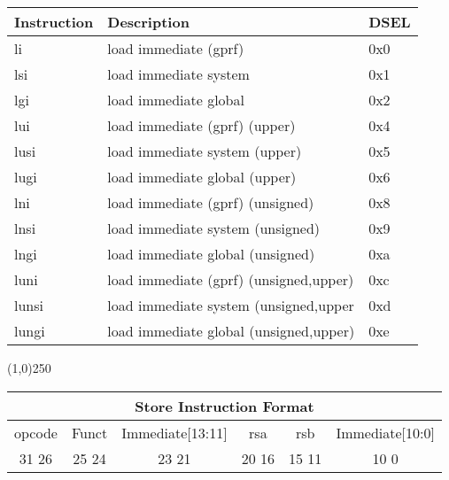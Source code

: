 \documentclass[letterpaper, 11pt]{article}
\begin{document}
	\begin{center}
		\begin{tabular}{|l|l|l|} \hline
			Instruction & Description 								& DSEL\\ \hline
			li			& load immediate (gprf)						& 0x0 \\ \hline
			lsi			& load immediate system						& 0x1 \\ \hline
			lgi			& load immediate global						& 0x2 \\ \hline
			lui			& load immediate (gprf)	(upper)				& 0x4 \\ \hline
			lusi		& load immediate system	(upper)				& 0x5 \\ \hline
			lugi		& load immediate global	(upper)				& 0x6 \\ \hline
			lni			& load immediate (gprf)	(unsigned)			& 0x8 \\ \hline
			lnsi		& load immediate system	(unsigned)			& 0x9 \\ \hline
			lngi		& load immediate global	(unsigned)			& 0xa \\ \hline 
			luni		& load immediate (gprf) (unsigned,upper)	& 0xc \\ \hline
			lunsi		& load immediate system	(unsigned,upper		& 0xd \\ \hline
			lungi		& load immediate global	(unsigned,upper)	& 0xe \\ \hline

		\end{tabular}
	\end{center}

\begin{center}
	\line(1,0){250}
\end{center}


\begin{center}
		\begin{tabular}{|c|c|c|c|c|c|}
			\multicolumn{6}{c}{Store Instruction Format}\\ \hline
				\hspace{2pt} opcode \hspace{2pt} & \hspace{5pt} Funct \hspace{5pt} &  \hspace{4pt} Immediate[13:11] \hspace{4pt} & \hspace{4pt}rsa  \hspace{4pt} & \hspace{4pt}rsb  \hspace{4pt} &\hspace{10pt}Immediate[10:0]  \hspace{10pt}     \\	\hline
				31 \hfill 26& 25 \hfill 24 &23 \hfill 21 &20 \hfill  16& 15 \hfill  11&10 \hfill  0\\ \hline
		
	\end{tabular}
\end{center}
\end{document}
